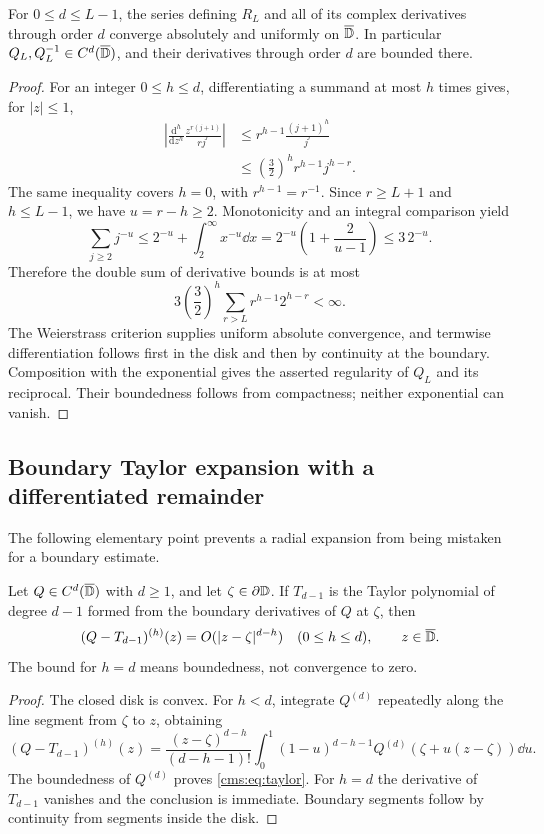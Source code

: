 \begin{lemma}\label{cms:lem:tail}
For $0\leq d\leq L-1$, the series defining $R_L$ and all of its complex derivatives through order $d$ converge absolutely and uniformly on $\overline{\mathbb D}$. In particular $Q_L,Q_L^{-1}\in C^d(\overline{\mathbb D})$, and their derivatives through order $d$ are bounded there.
\end{lemma}
\begin{proof}
For an integer $0\leq h\leq d$, differentiating a summand at most $h$ times gives, for $|z|\leq1$,
\begin{align*}
\left|\frac{\mathrm d^h}{\mathrm dz^h}
\frac{z^{r(j+1)}}{rj^r}\right|
&\leq r^{h-1}\frac{(j+1)^h}{j^r}\\
&\leq\left(\frac32\right)^h r^{h-1}j^{h-r}.
\end{align*}
The same inequality covers $h=0$, with $r^{h-1}=r^{-1}$. Since $r\geq L+1$ and $h\leq L-1$, we have $u=r-h\geq2$. Monotonicity and an integral comparison yield
\[
\sum_{j\geq2}j^{-u}
\leq2^{-u}+\int_2^\infty x^{-u}\dd x
=2^{-u}\left(1+\frac2{u-1}\right)
\leq3\,2^{-u}.
\]
Therefore the double sum of derivative bounds is at most
\begin{equation}\label{cms:eq:tailbound}
3\left(\frac32\right)^h
\sum_{r>L}r^{h-1}2^{h-r}<\infty.
\end{equation}
The Weierstrass criterion supplies uniform absolute convergence, and termwise differentiation follows first in the disk and then by continuity at the boundary. Composition with the exponential gives the asserted regularity of $Q_L$ and its reciprocal. Their boundedness follows from compactness; neither exponential can vanish.
\end{proof}

\subsection{Boundary Taylor expansion with a differentiated remainder}
The following elementary point prevents a radial expansion from being mistaken for a boundary estimate.
\begin{lemma}\label{cms:lem:taylor}
Let $Q\in C^d(\overline{\mathbb D})$ with $d\geq1$, and let $\zeta\in\partial\mathbb D$. If $T_{d-1}$ is the Taylor polynomial of degree $d-1$ formed from the boundary derivatives of $Q$ at $\zeta$, then
\begin{equation}\label{cms:eq:taylor}
(Q-T_{d-1})^{(h)}(z)=O(|z-\zeta|^{d-h})
\quad(0\leq h\leq d),\qquad z\in\overline{\mathbb D}.
\end{equation}
The bound for $h=d$ means boundedness, not convergence to zero.
\end{lemma}
\begin{proof}
The closed disk is convex. For $h<d$, integrate $Q^{(d)}$ repeatedly along the line segment from $\zeta$ to $z$, obtaining
\[
(Q-T_{d-1})^{(h)}(z)
=\frac{(z-\zeta)^{d-h}}{(d-h-1)!}
 \int_0^1(1-u)^{d-h-1}Q^{(d)}(\zeta+u(z-\zeta))\dd u.
\]
The boundedness of $Q^{(d)}$ proves \eqref{cms:eq:taylor}. For $h=d$ the derivative of $T_{d-1}$ vanishes and the conclusion is immediate. Boundary segments follow by continuity from segments inside the disk.
\end{proof}

